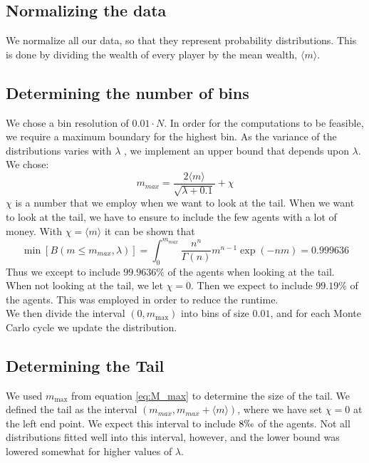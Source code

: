 \documentclass[a4paper, 10pt]{article}
\begin{document}
\subsection{Normalizing the data}
We normalize all our data, so that they represent probability distributions. This is done by dividing the wealth of every player by the mean wealth, $\langle m \rangle$. 
\subsection{Determining the number of bins}
We chose a bin resolution of $0.01 \cdot N$. In order for the computations to be feasible, we require a maximum boundary for the highest bin. As the variance of the distributions varies with $\lambda$ , we implement an upper bound that depends upon $\lambda$. We chose:
\begin{equation}\label{eq:M_max}
m_{max} = \frac{2\langle m \rangle}{\sqrt{\lambda + 0.1}} + \chi
\end{equation}
$\chi$ is a number that we employ when we want to look at the tail. When we want to look at the tail, we have to ensure to include the few agents with a lot of money. With $\chi = \langle m \rangle$ it can be shown that
\begin{equation}
\min[B(m\leq m_{max},\lambda)] = \int_0^{m_{max}} \frac{n^n}{\Gamma(n)}m^{n-1}\exp(-nm) = 0.999636 
\end{equation}
Thus we except to include $99.9636 \%$ of the agents when looking at the tail. \\
\linebreak
When not looking at the tail, we let $\chi = 0$. Then we expect to include $99.19\%$ of the agents. This was employed in order to reduce the runtime. \\
\linebreak
We then divide the interval $(0,m_{\max})$ into bins of size $0.01$, and for each Monte Carlo cycle we update the distribution.
\subsection{Determining the Tail}\label{Tail_section}
We used $m_{\max}$ from equation \ref{eq:M_max} to determine the size of the tail. We defined the tail as the interval $(m_{max},m_{max}+\langle m \rangle)$, where we have set $\chi=0$ at the left end point. We expect this interval to include $8 \permil$ of the agents. Not all distributions fitted well into this interval, however, and the lower bound was lowered somewhat for higher values of $\lambda$.
\end{document}
